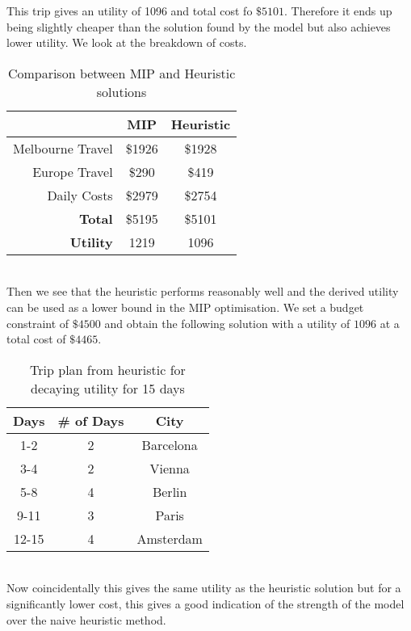 \documentclass[a4paper]{article}
\begin{document}
This trip gives an utility of 1096 and total cost fo $\$5101$. Therefore it ends up being slightly cheaper than the solution found by the model but also achieves lower utility. We look at the breakdown of costs.\\
\begin{table}[h]
\caption{Comparison between MIP and Heuristic solutions}
\centering
\begin{tabular}{r|c|c}
\hline
& MIP & Heuristic \\
\hline
Melbourne Travel & \$1926 & \$1928 \\
Europe Travel & \$290 & \$419 \\
Daily Costs & \$2979 & \$2754 \\
\hline
\hline
\textbf{Total} & \$5195 & \$5101 \\
\hline
\textbf{Utility} & 1219 & 1096 \\
\hline
\end{tabular}	
\end{table} \\
Then we see that the heuristic performs reasonably well and the derived utility can be used as a lower bound in the MIP optimisation. We set a budget constraint of $\$4500$ and obtain the following solution with a utility of $1096$ at a total cost of $\$4465$.
\begin{table}[h]
\caption{Trip plan from heuristic for decaying utility for 15 days}
\centering
\begin{tabular}{c|c|c}
	\hline
	\rule{0pt}{2ex} Days & \# of Days & City \\
	\hline
	1-2 & 2 & Barcelona \\
	3-4 & 2 & Vienna \\
	5-8 & 4 & Berlin \\
	9-11 & 3 & Paris \\
	12-15 & 4 & Amsterdam \\
	\hline
\end{tabular}
\vspace{1mm}
\end{table}\\
Now coincidentally this gives the same utility as the heuristic solution but for a significantly lower cost, this gives a good indication of the strength of the model over the naive heuristic method.
\end{document}
